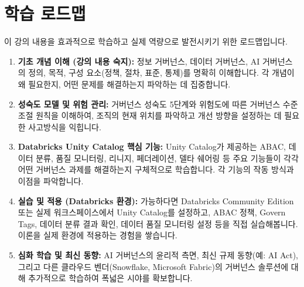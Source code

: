 \documentclass[11pt,a4paper]{article}
\begin{document}
\newpage
\section*{학습 로드맵}

이 강의 내용을 효과적으로 학습하고 실제 역량으로 발전시키기 위한 로드맵입니다.

\begin{enumerate}
    \item \textbf{기초 개념 이해 (강의 내용 숙지):}
    정보 거버넌스, 데이터 거버넌스, AI 거버넌스의 정의, 목적, 구성 요소(정책, 절차, 표준, 통제)를 명확히 이해합니다. 각 개념이 왜 필요한지, 어떤 문제를 해결하는지 파악하는 데 집중합니다.
    \item \textbf{성숙도 모델 및 위험 관리:}
    거버넌스 성숙도 5단계와 위험도에 따른 거버넌스 수준 조절 원칙을 이해하여, 조직의 현재 위치를 파악하고 개선 방향을 설정하는 데 필요한 사고방식을 익힙니다.
    \item \textbf{Databricks Unity Catalog 핵심 기능:}
    Unity Catalog가 제공하는 ABAC, 데이터 분류, 품질 모니터링, 리니지, 페더레이션, 델타 쉐어링 등 주요 기능들이 각각 어떤 거버넌스 과제를 해결하는지 구체적으로 학습합니다. 각 기능의 작동 방식과 이점을 파악합니다.
    \item \textbf{실습 및 적용 (Databricks 환경):}
    가능하다면 Databricks Community Edition 또는 실제 워크스페이스에서 Unity Catalog를 설정하고, ABAC 정책, Govern Tags, 데이터 분류 결과 확인, 데이터 품질 모니터링 설정 등을 직접 실습해봅니다. 이론을 실제 환경에 적용하는 경험을 쌓습니다.
    \item \textbf{심화 학습 및 최신 동향:}
    AI 거버넌스의 윤리적 측면, 최신 규제 동향(예: AI Act), 그리고 다른 클라우드 벤더(Snowflake, Microsoft Fabric)의 거버넌스 솔루션에 대해 추가적으로 학습하여 폭넓은 시야를 확보합니다.
\end{enumerate}
\end{document}
